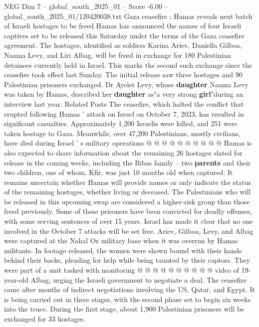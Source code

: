\begin{textsample}{NEG Dim 7 – global\_south\_2025\_01 – Score -6.00 – global\_south\_2025\_01/120420038.txt}  \label{ex:f7_neg_198}
Gaza ceasefire : Hamas reveals next batch of Israeli hostages to be freed Hamas has announced the names of four Israeli captives set to be released this Saturday under the terms of the Gaza ceasefire agreement.
The hostages, identified as soldiers Karina Ariev, Daniella Gilboa, Naama Levy, and Liri Albag, will be freed in exchange for 180 Palestinian detainees currently held in Israel.
This marks the second such exchange since the ceasefire took effect last Sunday.
The initial release saw three hostages and 90 Palestinian prisoners exchanged.
Dr Ayelet Levy, whose \textbf{daughter} Naama Levy was taken by Hamas, described her \textbf{daughter} as"a very strong \textbf{girl}"during an interview last year.
Related Posts The ceasefire, which halted the conflict that erupted following Hamas ' attack on Israel on October 7, 2023, has resulted in significant casualties.
Approximately 1,200 Israelis were killed, and 251 were taken hostage to Gaza.
Meanwhile, over 47,200 Palestinians, mostly civilians, have died during Israel ' s military operations @ @ @ @ @ @ @ @ @ @ Hamas is also expected to share information about the remaining 26 hostages slated for release in the coming weeks, including the Bibas family -- two \textbf{parents} and their two children, one of whom, Kfir, was just 10 months old when captured.
It remains uncertain whether Hamas will provide names or only indicate the status of the remaining hostages, whether living or deceased.
The Palestinians who will be released in this upcoming swap are considered a higher-risk group than those freed previously.
Some of these prisoners have been convicted for deadly offenses, with some serving sentences of over 15 years.
Israel has made it clear that no one involved in the October 7 attacks will be set free.
Ariev, Gilboa, Levy, and Albag were captured at the Nahal Oz military base when it was overrun by Hamas militants.
In footage released, the women were shown bound with their hands behind their backs, pleading for help while being taunted by their captors.
They were part of a unit tasked with monitoring @ @ @ @ @ @ @ @ @ @ video of 19-year-old Albag, urging the Israeli government to negotiate a deal.
The ceasefire came after months of indirect negotiations involving the US, Qatar, and Egypt.
It is being carried out in three stages, with the second phase set to begin six weeks into the truce.
During the first stage, about 1,900 Palestinian prisoners will be exchanged for 33 hostages.

\end{textsample}
